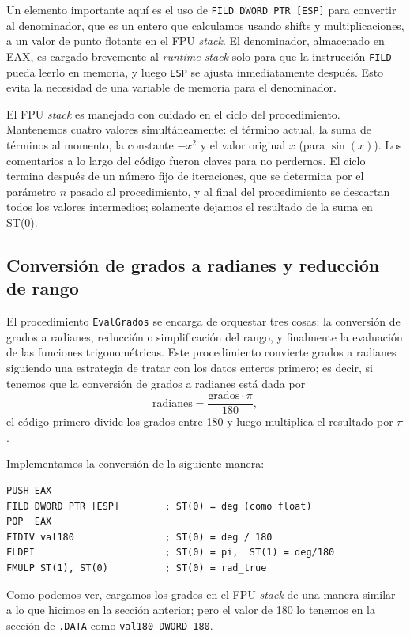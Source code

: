 \documentclass[12pt]{article}
\begin{document}
Un elemento importante aquí es el uso de \texttt{FILD DWORD PTR [ESP]} para
convertir al denominador, que es un entero que calculamos usando shifts y
multiplicaciones, a un valor de punto flotante en el FPU \textit{stack}. El
denominador, almacenado en EAX, es cargado brevemente al \textit{runtime stack}
solo para que la instrucción \texttt{FILD} pueda leerlo en memoria, y luego
\texttt{ESP} se ajusta inmediatamente después. Esto evita la necesidad de una
variable de memoria para el denominador.

El FPU \textit{stack} es manejado con cuidado en el ciclo del procedimiento.
Mantenemos cuatro valores simultáneamente: el término actual, la suma de
términos al momento, la constante $-x^2$ y el valor original $x$ (para
$\sin(x)$). Los comentarios a lo largo del código fueron claves para no
perdernos. El ciclo termina después de un número fijo de iteraciones, que se
determina por el parámetro $n$ pasado al procedimiento, y al final del
procedimiento se descartan todos los valores intermedios; solamente dejamos el
resultado de la suma en ST(0).

\subsection{Conversión de grados a radianes y reducción de rango} \label{sec:rango}

El procedimiento \texttt{EvalGrados} se encarga de orquestar tres cosas: la
conversión de grados a radianes, reducción o simplificación del rango, y
finalmente la evaluación de las funciones trigonométricas. Este procedimiento
convierte grados a radianes siguiendo una estrategia de tratar con los datos
enteros primero; es decir, si tenemos que la conversión de grados a radianes
está dada por
\begin{equation*}
  \textrm{radianes} = \frac{\textrm{grados} \cdot \pi}{180},
\end{equation*}
el código primero divide los grados entre 180 y luego multiplica el resultado
por $\pi$.

Implementamos la conversión de la siguiente manera:
\begin{lstlisting}[language={[x86masm]Assembler}]
PUSH EAX
FILD DWORD PTR [ESP]        ; ST(0) = deg (como float)
POP  EAX
FIDIV val180                ; ST(0) = deg / 180
FLDPI                       ; ST(0) = pi,  ST(1) = deg/180
FMULP ST(1), ST(0)          ; ST(0) = rad_true
\end{lstlisting}
Como podemos ver, cargamos los grados en el FPU \textit{stack} de una manera
similar a lo que hicimos en la sección anterior; pero el valor de 180 lo
tenemos en la sección de \texttt{.DATA} como \texttt{val180  DWORD 180}.
\end{document}
